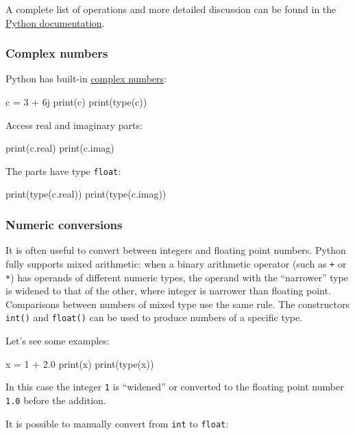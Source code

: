 \documentclass[12pt]{article} \newif\ifsolution\solutiontrue %
\begin{document}
A complete list of operations and more detailed discussion can be found
in the
\href{https://docs.python.org/3/library/stdtypes.html\#numeric-types-int-float-complex}{Python
documentation}.

\subsubsection{Complex numbers}\label{complex-numbers}

Python has built-in
\href{https://docs.python.org/3/library/stdtypes.html\#typesnumeric}{complex
numbers}:

\begin{python}
c = 3 + 6j
print(c)
print(type(c))
\end{python}

Access real and imaginary parts:

\begin{python}
print(c.real)
print(c.imag)
\end{python}

The parts have type \texttt{float}:

\begin{python}
print(type(c.real))
print(type(c.imag))
\end{python}

\subsubsection{Numeric conversions}\label{numeric-conversions}

It is often useful to convert between integers and floating point
numbers. Python fully supports mixed arithmetic: when a binary
arithmetic operator (such as \texttt{+} or \texttt{*}) has operands of
different numeric types, the operand with the ``narrower'' type is
widened to that of the other, where integer is narrower than floating
point. Comparisons between numbers of mixed type use the same rule. The
constructors \texttt{int()} and \texttt{float()} can be used to produce
numbers of a specific type.

Let's see some examples:

\begin{python}
x = 1 + 2.0
print(x)
print(type(x))
\end{python}

In this case the integer \texttt{1} is ``widened'' or converted to the
floating point number \texttt{1.0} before the addition.

It is possible to manually convert from \texttt{int} to \texttt{float}:
\end{document}
